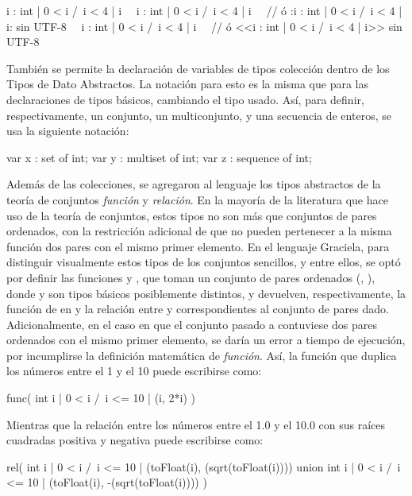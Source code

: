 \begin{gracielacode}
{i : int | 0 < i /\ i < 4 | i}
~\Lbag~i : int | 0 < i /\ i < 4 | i~\Rbag~
  // ó {:i : int | 0 < i /\ i < 4 | i:} sin UTF-8
~\Lseq~i : int | 0 < i /\ i < 4 | i~\Rseq~
  // ó <<i : int | 0 < i /\ i < 4 | i>> sin UTF-8
\end{gracielacode}

También se permite la declaración de variables de tipos colección dentro de los
Tipos de Dato Abstractos. La notación para esto es la misma que para las
declaraciones de tipos básicos, cambiando el tipo usado. Así, para definir,
respectivamente, un conjunto, un multiconjunto, y una secuencia de enteros, se
usa la siguiente notación:

\begin{gracielacode}
var x : set of int;
var y : multiset of int;
var z : sequence of int;
\end{gracielacode}

Además de las colecciones, se agregaron al lenguaje los tipos abstractos de la
teoría de conjuntos \textit{función} y \textit{relación}. En la mayoría de la
literatura que hace uso de la teoría de conjuntos, estos tipos no son más que
conjuntos de pares ordenados, con la restricción adicional de que no pueden
pertenecer a la misma función dos pares con el mismo primer elemento. En el
lenguaje Graciela, para distinguir visualmente estos tipos de los conjuntos
sencillos, y entre ellos, se optó por definir las funciones  y
, que toman un conjunto de pares ordenados (, ),
donde  y  son tipos básicos posiblemente distintos, y
devuelven, respectivamente, la función de  en  y la relación
entre  y  correspondientes al conjunto de pares dado.
Adicionalmente, en el caso en que el conjunto pasado a  contuviese
dos pares ordenados con el mismo primer elemento, se daría un error a tiempo de
ejecución, por incumplirse la definición matemática de \textit{función}. Así, la
función que duplica los números entre el 1 y el 10 puede escribirse como:

\begin{gracielacode}
func({ int i | 0 < i /\ i <= 10 | (i, 2*i) })
\end{gracielacode}

Mientras que la relación entre los números entre el 1.0 y el 10.0 con sus raíces
cuadradas positiva y negativa puede escribirse como:

\begin{gracielacode}
rel(
  { int i | 0 < i /\ i <= 10 |
    (toFloat(i),  (sqrt(toFloat(i))))
  } union
  { int i | 0 < i /\ i <= 10 |
    (toFloat(i), -(sqrt(toFloat(i))))
  }
)
\end{gracielacode}

